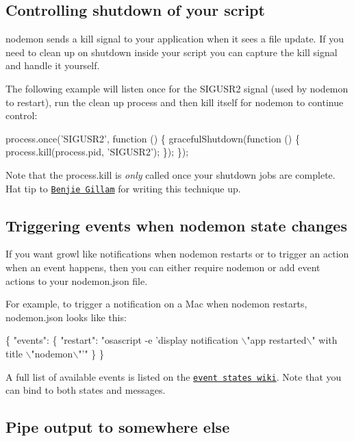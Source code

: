 \subsection*{Controlling shutdown of your script}

nodemon sends a kill signal to your application when it sees a file update. If you need to clean up on shutdown inside your script you can capture the kill signal and handle it yourself.

The following example will listen once for the {\ttfamily S\+I\+G\+U\+S\+R2} signal (used by nodemon to restart), run the clean up process and then kill itself for nodemon to continue control\+:


\begin{DoxyCode}
process.once('SIGUSR2', function () \{
  gracefulShutdown(function () \{
    process.kill(process.pid, 'SIGUSR2');
  \});
\});
\end{DoxyCode}


Note that the {\ttfamily process.\+kill} is {\itshape only} called once your shutdown jobs are complete. Hat tip to \href{http://www.benjiegillam.com/2011/08/node-js-clean-restart-and-faster-development-with-nodemon/}{\tt Benjie Gillam} for writing this technique up.

\subsection*{Triggering events when nodemon state changes}

If you want growl like notifications when nodemon restarts or to trigger an action when an event happens, then you can either {\ttfamily require} nodemon or add event actions to your {\ttfamily nodemon.\+json} file.

For example, to trigger a notification on a Mac when nodemon restarts, {\ttfamily nodemon.\+json} looks like this\+:


\begin{DoxyCode}
\{
  "events": \{
    "restart": "osascript -e 'display notification \(\backslash\)"app restarted\(\backslash\)" with title \(\backslash\)"nodemon\(\backslash\)"'"
  \}
\}
\end{DoxyCode}


A full list of available events is listed on the \href{https://github.com/remy/nodemon/wiki/Events#states}{\tt event states wiki}. Note that you can bind to both states and messages.

\subsection*{Pipe output to somewhere else}


